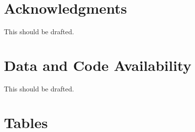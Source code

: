\documentclass[11pt]{article}
\begin{document}
\section*{Acknowledgments}
This should be drafted.

\section*{Data and Code Availability}
This should be drafted.


\renewcommand{\theequation}{A\arabic{equation}}
\renewcommand{\thetable}{A\arabic{table}}
\setcounter{equation}{0}  %
\setcounter{figure}{0}
\setcounter{table}{0}

%
%




\newpage{}

\section*{Tables}
\renewcommand{\thetable}{\arabic{table}}
\setcounter{table}{0}

\renewcommand{\thetable}{\arabic{table}}
\setcounter{table}{0}
\end{document}
